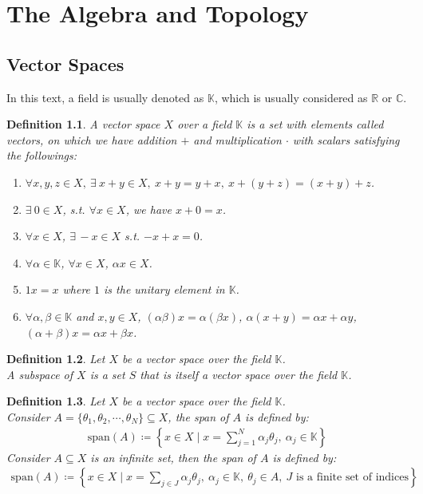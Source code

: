 \documentclass[11pt]{book}
\theoremstyle{break}
\theoremstyle{break}
\newtheorem{defn}{Definition}[corL]
\newcommand{\R}{\mathbb{R}}
\newcommand{\C}{\mathbb{C}}
\newcommand{\spa}{\text{span}}
\begin{document}
\newpage
\chapter{The Algebra and Topology}
\setcounter{section}{7}
\section[Vector Spaces]{\color{red}Vector Spaces\color{black}}

In this text, a field is usually denoted as $\mathbb{K}$, which is usually considered as $\R$ or $\C$.\\

\begin{defn}
A vector space $X$ over a field $\mathbb{K}$ is a set with elements called vectors, on which we have addition $+$ and multiplication $\cdot $ with scalars satisfying the followings:
\begin{enumerate}[topsep=3pt,itemsep=-1ex,partopsep=1ex,parsep=1ex]
\item $\forall x,y,z\in X,\ \exists\ x+y \in X,\ x+y = y+x,\ x+(y+z) = (x+y)+z$.
\item $\exists\ 0 \in X$, s.t. $\forall x \in X$, we have $x+0 = x$.
\item $\forall x \in X$, $\exists\, -x \in X$ s.t. $-x+x = 0$.
\item $\forall \alpha \in \mathbb{K}$, $\forall x \in X$, $\alpha x \in X$.
\item $1x =x$ where $1$ is the unitary element in $\mathbb{K}$.
\item $\forall \alpha,\beta \in \mathbb{K}$ and $x,y \in X$, $(\alpha\beta) x = \alpha(\beta x)$, $\alpha(x+y) = \alpha x + \alpha y $, $(\alpha+\beta)x = \alpha x + \beta x$.
\end{enumerate}
\end{defn}

\begin{defn}
Let $X$ be a vector space over the field $\mathbb{K}$.\\
A subspace of $X$ is a set $S$ that is itself a vector space over the field $\mathbb{K}$.
\end{defn}

\begin{defn}
Let $X$ be a vector space over the field $\mathbb{K}$.\\
Consider $A = \{\theta_1, \theta_2, \cdots, \theta_N\} \subseteq X$, the span of $A$ is defined by:
\begin{align*}
\spa (A) \coloneqq \left\{ x \in X \mid x = \sum_{j=1}^N \alpha_j \theta_j, \ \alpha_j \in \mathbb{K} \right\}
\end{align*}
Consider $A \subseteq X$ is an infinite set, then the span of $A$ is defined by:
\begin{align*}
\spa (A) \coloneqq \left\{ x \in X \mid x = \sum_{j \in J}\alpha_j \theta_j, \ \alpha_j \in \mathbb{K}, \ \theta_j \in A, \ J \text{ is a finite set of indices}\right\}
\end{align*}
\end{defn}
\end{document}
